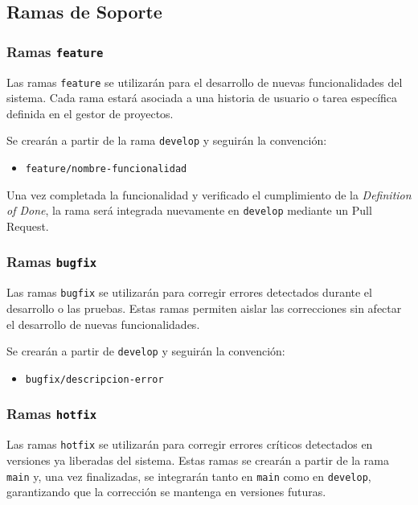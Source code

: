 \documentclass[12pt]{article}
\begin{document}
\subsection{Ramas de Soporte}

\subsubsection{Ramas \texttt{feature}}

Las ramas \texttt{feature} se utilizarán para el desarrollo de nuevas funcionalidades del sistema. Cada rama estará asociada a una historia de usuario o tarea específica definida en el gestor de proyectos.

Se crearán a partir de la rama \texttt{develop} y seguirán la convención:
\begin{itemize}
    \item \texttt{feature/nombre-funcionalidad}
\end{itemize}

Una vez completada la funcionalidad y verificado el cumplimiento de la \textit{Definition of Done}, la rama será integrada nuevamente en \texttt{develop} mediante un Pull Request.

\subsubsection{Ramas \texttt{bugfix}}

Las ramas \texttt{bugfix} se utilizarán para corregir errores detectados durante el desarrollo o las pruebas. Estas ramas permiten aislar las correcciones sin afectar el desarrollo de nuevas funcionalidades.

Se crearán a partir de \texttt{develop} y seguirán la convención:
\begin{itemize}
    \item \texttt{bugfix/descripcion-error}
\end{itemize}

\subsubsection{Ramas \texttt{hotfix}}

Las ramas \texttt{hotfix} se utilizarán para corregir errores críticos detectados en versiones ya liberadas del sistema. Estas ramas se crearán a partir de la rama \texttt{main} y, una vez finalizadas, se integrarán tanto en \texttt{main} como en \texttt{develop}, garantizando que la corrección se mantenga en versiones futuras.
\end{document}

